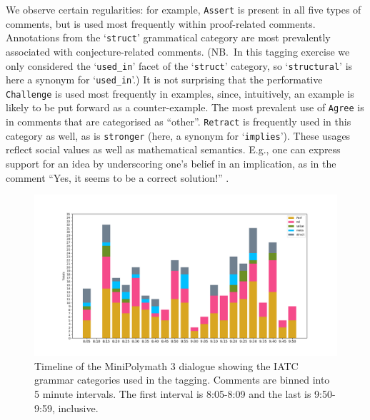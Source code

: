\documentclass[smallextended,oneside]{svjour3}       %
\let\cite\citep
\newcommand\nothing[1]{#1}
\let\paragraph\nothing
\begin{document}
\paragraph{We observe certain regularities: for example, \texttt{Assert} is present in all five types of comments, but is used most frequently within proof-related comments.}
Annotations from the `\texttt{struct}' grammatical category are most prevalently associated with conjecture-related comments.
(NB.~In this tagging exercise we only considered the `\texttt{used\_in}' facet of the `\texttt{struct}' category, so `\texttt{structural}' is here a synonym for `\texttt{used\_in}'.)
It is not surprising that the performative \texttt{Challenge} is used
most frequently in examples, since, intuitively, an example is likely
to be put forward as a counter-example.  The most prevalent use of
\texttt{Agree} is in comments that are categorised as ``other''.
\texttt{Retract} is frequently used in this category as well, as is
\texttt{stronger} (here, a synonym for `\texttt{implies}').
These usages reflect social
values as well as mathematical semantics.  E.g., one can express support for
an idea by underscoring one's belief in an implication, as in the comment
``Yes, it seems to be a correct solution!'' \cite[\href{https://wp.me/pAG2F-41\#comment-3402}{July 19, 9:35 pm}]{tao2011imo}.

\begin{figure}[h]
\begin{center}
\includegraphics[trim=3cm 1.2cm 3cm 1.2cm,clip=true,width=\textwidth]{grammar-categories-revised}
\end{center}
\caption{Timeline of the MiniPolymath 3 dialogue showing the IATC grammar categories used in the tagging.   Comments are binned into 5 minute intervals.  The first interval is 8:05-8:09 and the last is 9:50-9:59, inclusive.
\label{fig:grammar-categories}}
\end{figure}
\end{document}
